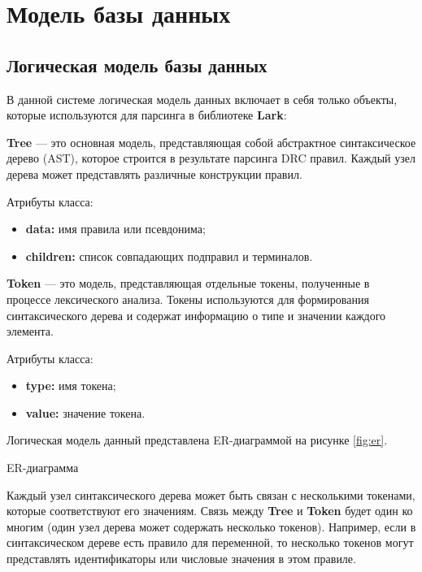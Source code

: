 \section{Модель базы данных}

\subsection{Логическая модель базы данных}

В данной системе логическая модель данных включает в себя только объекты,
которые используются для парсинга в библиотеке \textbf{Lark}:

\textbf{Tree} --- это основная модель,
представляющая собой абстрактное синтаксическое дерево (AST),
которое строится в результате парсинга DRC правил.
Каждый узел дерева может представлять различные конструкции правил.

Атрибуты класса:

\begin{itemize}
	\item \textbf{data:} имя правила или псевдонима;
	\item \textbf{children:} список совпадающих подправил и терминалов.
\end{itemize}

\textbf{Token} --- это модель, представляющая отдельные токены,
полученные в процессе лексического анализа.
Токены используются для формирования синтаксического дерева
и содержат информацию о типе и значении каждого элемента.

Атрибуты класса:

\begin{itemize}
	\item \textbf{type:} имя токена;
	\item \textbf{value:} значение токена.
\end{itemize}

Логическая модель данный представлена ER-диаграммой на рисунке \ref{fig:er}.

\begin{image}
	\caption{ER-диаграмма}
	\label{fig:er}
\end{image}

Каждый узел синтаксического дерева может быть связан
с несколькими токенами, которые соответствуют его значениям.
Связь между \textbf{Tree} и \textbf{Token} будет один ко многим
(один узел дерева может содержать несколько токенов).
Например, если в синтаксическом дереве есть правило для переменной,
то несколько токенов могут представлять идентификаторы
или числовые значения в этом правиле.

